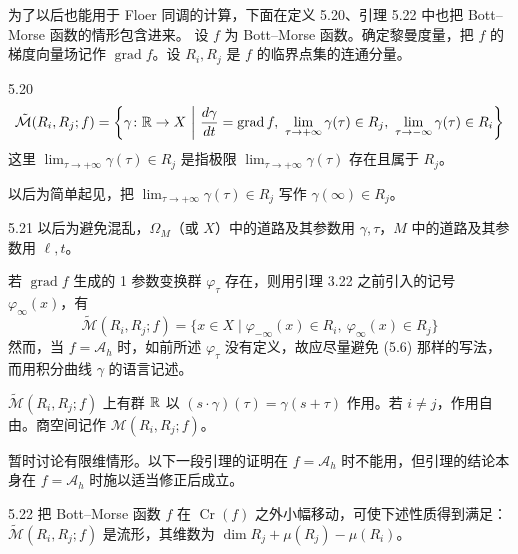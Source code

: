 为了以后也能用于 Floer 同调的计算，下面在定义 5.20、引理 5.22 中也把 Bott–Morse 函数的情形包含进来。
设 $f$ 为 Bott–Morse 函数。确定黎曼度量，把 $f$ 的梯度向量场记作 $\operatorname{grad}f$。设 $R_i,R_j$ 是 $f$ 的临界点集的连通分量。

\begin{definition}{5.20}
  \[
    \tilde{\mathcal{M}}(R_i,R_j;f)=\left\{\gamma\colon\mathbb{R}\to X\ \middle|\
    \frac{d\gamma}{dt}=\operatorname{grad}f,\
    \lim_{\tau\to+\infty}\gamma(\tau)\in R_j,\
    \lim_{\tau\to-\infty}\gamma(\tau)\in R_i\right\}
  \]
  这里 $\lim_{\tau\to+\infty}\gamma(\tau)\in R_j$ 是指极限 $\lim_{\tau\to+\infty}\gamma(\tau)$ 存在且属于 $R_j$。
\end{definition}

以后为简单起见，把 $\lim_{\tau\to+\infty}\gamma(\tau)\in R_j$ 写作 $\gamma(\infty)\in R_j$。

\begin{remark}{5.21}
  以后为避免混乱，$\Omega_M$（或 $X$）中的道路及其参数用 $\gamma,\tau$，$M$ 中的道路及其参数用 $\ell,t$。
\end{remark}

若 $\operatorname{grad}f$ 生成的 1 参数变换群 $\varphi_\tau$ 存在，则用引理 3.22 之前引入的记号 $\varphi_\infty(x)$，有
\begin{equation}
  \tilde{\mathcal{M}}(R_i,R_j;f)=\{x\in X\mid\varphi_{-\infty}(x)\in R_i,\ \varphi_\infty(x)\in R_j\} \tag{5.6}
\end{equation}
然而，当 $f=\mathcal{A}_h$ 时，如前所述 $\varphi_\tau$ 没有定义，故应尽量避免 (5.6) 那样的写法，而用积分曲线 $\gamma$ 的语言记述。


$\tilde{\mathcal{M}}(R_i,R_j;f)$ 上有群 $\mathbb{R}$ 以 $(s\cdot\gamma)(\tau)=\gamma(s+\tau)$ 作用。若 $i\ne j$，作用自由。商空间记作 $\mathcal{M}(R_i,R_j;f)$。

暂时讨论有限维情形。以下一段引理的证明在 $f=\mathcal{A}_h$ 时不能用，但引理的结论本身在 $f=\mathcal{A}_h$ 时施以适当修正后成立。

\begin{lemma*}{5.22}
  把 Bott–Morse 函数 $f$ 在 $\operatorname{Cr}(f)$ 之外小幅移动，可使下述性质得到满足：$\tilde{\mathcal{M}}(R_i,R_j;f)$ 是流形，其维数为 $\dim R_j+\mu(R_j)-\mu(R_i)$。
\end{lemma*}


